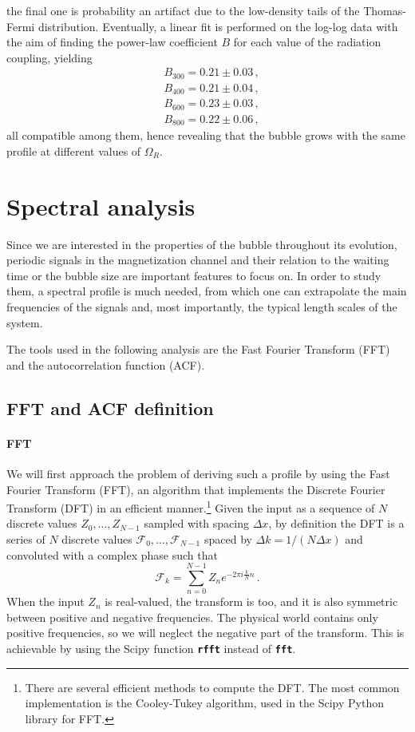 the final one is probability an artifact due to the low-density tails of the Thomas-Fermi distribution. Eventually, a linear fit is performed on the log-log data with the aim of finding the power-law coefficient $B$ for each value of the radiation coupling, yielding
\begin{align*}
    &B_{300} = 0.21 \pm 0.03\, ,\\
    &B_{400} = 0.21 \pm 0.04\, ,\\
    &B_{600} = 0.23 \pm 0.03\, ,\\
    &B_{800} = 0.22 \pm 0.06\, ,
\end{align*}
all compatible among them, hence revealing that the bubble grows with the same profile at different values of $\Omega_R$.

\section{Spectral analysis}
Since we are interested in the properties of the bubble throughout its evolution, periodic signals in the magnetization channel and their relation to the waiting time or the bubble size are important features to focus on. In order to study them, a spectral profile is much needed, from which one can extrapolate the main frequencies of the signals and, most importantly, the typical length scales of the system.

The tools used in the following analysis are the Fast Fourier Transform (FFT) and the autocorrelation function (ACF).

\subsection{FFT and ACF definition}
\paragraph{FFT}
We will first approach the problem of deriving such a profile by using the Fast Fourier Transform (FFT), an algorithm that implements the Discrete Fourier Transform (DFT) in an efficient manner.\footnote{There are several efficient methods to compute the DFT. The most common implementation is the Cooley-Tukey algorithm, used in the Scipy Python library for FFT.} Given the input as a sequence of $N$ discrete values $Z_0,\dots,Z_{N-1}$ sampled with spacing $\Delta x$, by definition the DFT is a series of $N$ discrete values $\mathcal{F}_0,\dots,\mathcal{F}_{N-1}$ spaced by $\Delta k = 1/(N\Delta x)$ and convoluted with a complex phase such that
\begin{equation*}
    \mathcal{F}_k = \sum_{n=0}^{N-1} Z_n e^{-2\pi i \frac{k}{N}n}\, .
\end{equation*}
When the input $Z_n$ is real-valued, the transform is too, and it is also symmetric between positive and negative frequencies. The physical world contains only positive frequencies, so we will neglect the negative part of the transform. This is achievable by using the Scipy function \texttt{\textbf{rfft}} instead of \texttt{\textbf{fft}}.

